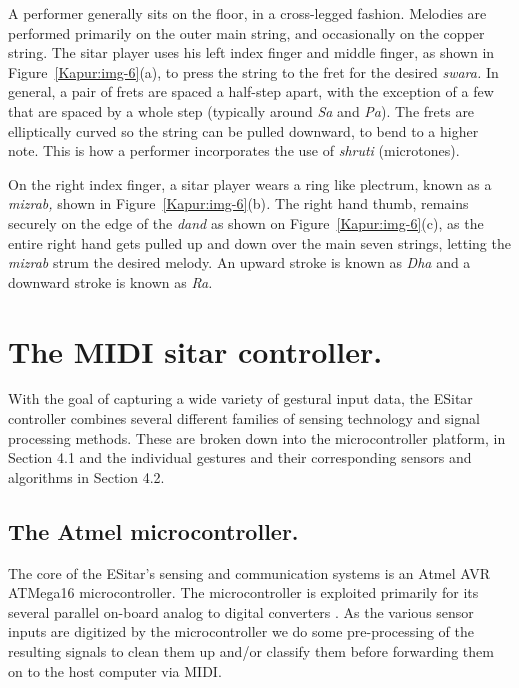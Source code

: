 A performer generally sits on the floor, in a cross-legged fashion. Melodies are
performed primarily on the outer main string, and occasionally on the copper
string. The sitar player uses his left index finger and middle finger, as shown
in Figure~\ref{Kapur:img-6}(a), to press the string to the fret for the desired \textit{swara.}
In general, a pair of frets are spaced a half-step apart, with the exception of a
few that are spaced by a whole step (typically around \textit{Sa }and
\textit{Pa}).\textit{ }The frets are elliptically curved so the string can be
pulled downward, to bend to a higher note. This is how a performer incorporates
the use of \textit{shruti }(microtones).

On the right index finger, a sitar player wears a ring like plectrum, known as a
\textit{mizrab, }shown in Figure~\ref{Kapur:img-6}(b)\textit{. }The right hand thumb, remains
securely on the edge of the \textit{dand} as shown on Figure~\ref{Kapur:img-6}(c), as the entire
right hand gets pulled up and down over the main seven strings, letting the
\textit{mizrab }strum the desired melody. An upward stroke is known as
\textit{Dha }and a downward stroke is known as \textit{Ra. } \cite{Bagchee:1998,Vir:1998}

\section{The  MIDI  sitar controller.}

With the goal of capturing a wide variety of gestural input data, the
ESitar controller combines several different families of sensing
technology and signal processing methods.  These are broken down into the
microcontroller platform, in Section 4.1 and the individual gestures and their
corresponding sensors and algorithms in Section 4.2.

\subsection{The Atmel microcontroller.}

The core of the ESitar's sensing and communication systems is an Atmel
AVR ATMega16 microcontroller. The microcontroller is exploited primarily for its
several parallel on-board analog to digital converters \cite{Wilson:2003}.  As the various
sensor inputs are digitized by the microcontroller we do some pre-processing of
the resulting signals to clean them up and/or classify them before forwarding
them on to the host computer via MIDI.


